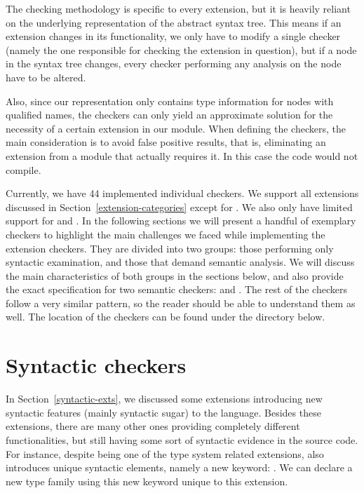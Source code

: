 \documentclass[main.tex]{subfiles}
\begin{document}
	
	The checking methodology is specific to every extension, but it is heavily reliant on the underlying representation of the abstract syntax tree. This means if an extension changes in its functionality, we only have to modify a single checker (namely the one responsible for checking the extension in question), but if a node in the syntax tree changes, every checker performing any analysis on the node have to be altered.
	
	Also, since our representation only contains type information for nodes with qualified names, the checkers can only yield an approximate solution for the necessity of a certain extension in our module. When defining the checkers, the main consideration is to avoid false positive results, that is, eliminating an extension from a module that actually requires it. In this case the code would not compile.
	
	Currently, we have 44 implemented individual checkers. We support all extensions discussed in Section~\ref{extension-categories} except for . We also only have limited support for  and . In the following sections we will present a handful of exemplary checkers to highlight the main challenges we faced while implementing the extension checkers. They are divided into two groups: those performing only syntactic examination, and those that demand semantic analysis. We will discuss the main characteristics of both groups in the sections below, and also provide the exact specification for two semantic checkers:  and . The rest of the checkers follow a very similar pattern, so the reader should be able to understand them as well. The location of the checkers can be found under the directory below.
	
	\newpage
	
	\section{Syntactic checkers}
	
	In Section~\ref{syntactic-exts}, we discussed some extensions introducing new syntactic features (mainly syntactic sugar) to the language. Besides these extensions, there are many other ones providing completely different functionalities, but still having some sort of syntactic evidence in the source code. For instance, despite being one of the type system related extensions,  also introduces unique syntactic elements, namely a new keyword: . We can declare a new type family using this new keyword unique to this extension.
	
\end{document}
